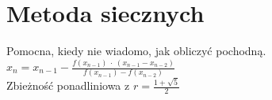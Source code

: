 \section{Metoda siecznych}
Pomocna, kiedy nie wiadomo, jak obliczyć pochodną. \\
\( x_{n} = x_{n-1} - \frac{f(x_{n-1}) \:\cdot\: (x_{n-1} - x_{n-2})}{f (x_{n-1}) - f(x_{n-2})} \) \\
Zbieżność ponadliniowa z \( r = \frac{1 + \sqrt{5}}{2} \)